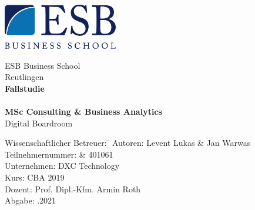 \begin{titlepage}
\begin{minipage}{\textwidth}
		\vspace{-2cm}
\begin{center}\includegraphics[width=5cm,keepaspectratio]{img/logo.png}\end{center}
\end{minipage}
\vspace{1em}
\sffamily
\begin{center}
	\textsf{\large{}ESB Business School\\[1.5mm] Reutlingen}\\[2em]
	\vspace{4em}
	\textsf{\textbf{\Large{}Fallstudie}}\\[3mm]
	\textsf{\textbf{\DerTitelDerArbeit}} \\[1.5cm]
		\vspace{4em}
	\textsf{\textbf{\Large{}MSc Consulting \& Business Analytics}\\[3mm] \textsf{Digital Boardroom}}
	

\vfill
	\vspace{2em}
\begin{minipage}{\textwidth}

\begin{tabbing}
	Wissenschaftlicher Betreuer: \hspace{0.85cm}\=\kill
	Autoren: \> Levent Lukas \& Jan Warwas \\[1.5mm]
	Teilnehmernummer:  \& 401061 \\[1.5mm]
	Unternehmen: \> DXC Technology  \\[1.5mm]
	Kurs: \> CBA 2019 \\[1.5mm]
	Dozent: \> Prof. Dipl.-Kfm. Armin Roth  \\[1.5mm]
	Abgabe: .2021
\end{tabbing}
\end{minipage}

\end{center}

\end{titlepage}
